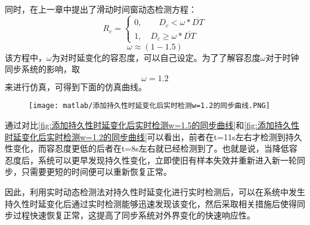同时，在上一章中提出了滑动时间窗动态检测方程：
\begin{equation}
R_{c} = \left\{
  \begin{array}{ll} %
    0, \qquad D_{c} < \omega * \overline{DT} \\
    1, \quad D_{c} \geq \omega * \overline{DT} 
  \end{array}
  \right. 
\end{equation}
\begin{equation}
  \omega \approx (1 - 1.5)
\end{equation}
该方程中，$\omega$为对时延变化的容忍度，可以自己设定。为了了解容忍度$\omega$对于时钟同步系统的影响，取
\begin{equation}
  \omega = 1.2
\end{equation}
来进行仿真，可得到下面的仿真曲线。
\begin{figure}[htbp]
  \centering
  \begin{minipage}[b]{1\textwidth}
    \captionstyle{\centering}
    \centering
    \texttt{[image: matlab/添加持久性时延变化后实时检测w=1.2的同步曲线.PNG]}
  \end{minipage}     
\end{figure}

通过对比\ref{fig:添加持久性时延变化后实时检测w=1.5的同步曲线}和\ref{fig:添加持久性时延变化后实时检测w=1.2的同步曲线}可以看出，前者在t=11s左右才检测到持久性变化，而容忍度更低的后者在t=8s左右就已经检测到了。也就是说，当降低容忍度后，系统可以更早发现持久性变化，立即使旧有样本失效并重新进入新一轮同步，只需要更短的时间便可以重新恢复正常。

因此，利用实时动态检测法对持久性时延变化进行实时检测后，可以在系统中发生持久性时延变化后通过实时检测能够迅速发现该变化，然后采取相关措施后使得同步过程快速恢复正常，这提高了同步系统对外界变化的快速响应性。

